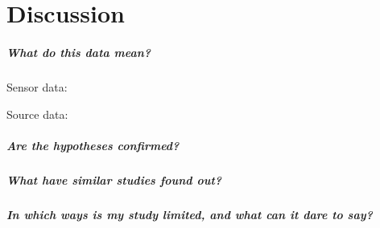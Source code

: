 
\chapter{Discussion}

\paragraph{What do this data mean?}
Sensor data:

Source data:


\paragraph{Are the hypotheses confirmed?}

\paragraph{What have similar studies found out?}

\paragraph{In which ways is my study limited, and what can it dare to say?}
